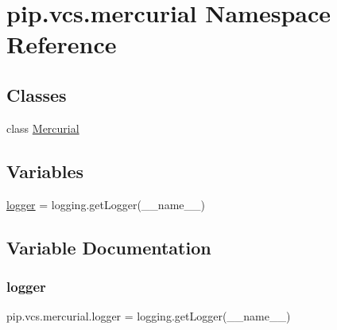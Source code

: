 \hypertarget{namespacepip_1_1vcs_1_1mercurial}{}\section{pip.\+vcs.\+mercurial Namespace Reference}
\label{namespacepip_1_1vcs_1_1mercurial}
\subsection*{Classes}
\begin{DoxyCompactItemize}
\item 
class \hyperlink{classpip_1_1vcs_1_1mercurial_1_1_mercurial}{Mercurial}
\end{DoxyCompactItemize}
\subsection*{Variables}
\begin{DoxyCompactItemize}
\item 
\hyperlink{namespacepip_1_1vcs_1_1mercurial_a6bc3f006a528f5e6032aba3f7ac65c0b}{logger} = logging.\+get\+Logger(\+\_\+\+\_\+name\+\_\+\+\_\+)
\end{DoxyCompactItemize}


\subsection{Variable Documentation}
\mbox{\label{namespacepip_1_1vcs_1_1mercurial_a6bc3f006a528f5e6032aba3f7ac65c0b}} 
\subsubsection{\texorpdfstring{logger}{logger}}
{\footnotesize\ttfamily pip.\+vcs.\+mercurial.\+logger = logging.\+get\+Logger(\+\_\+\+\_\+name\+\_\+\+\_\+)}

